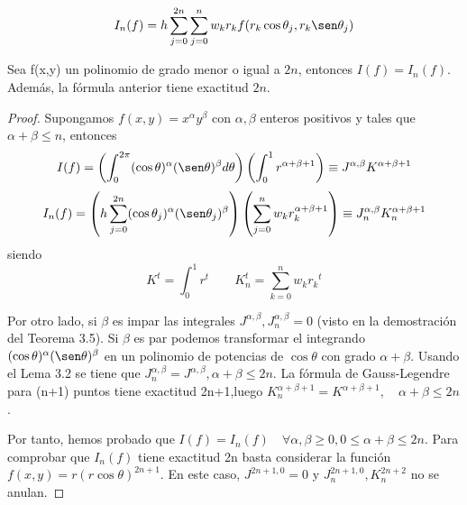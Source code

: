 $$ I_n(f) = h\sum_{j=0}^{2n}\sum_{j=0}^{n} w_k r_k f(r_k \cos\theta_j,r_k\sen\theta_j)$$
\begin{thm}Sea f(x,y) un polinomio de grado menor o igual a $2n$, entonces $I(f)=I_n(f)$. Además, la fórmula anterior tiene exactitud $2n$. 
\end{thm}
\begin{proof}
	Supongamos $f(x,y)=x^\alpha y^\beta$ con  $\alpha,\beta$ enteros positivos y tales que  $\alpha+\beta \le n$, entonces
	$$
	I(f)=\left(\int_{0}^{2\pi}(\cos\theta)^{\alpha}(\sen\theta)^{\beta}d\theta\right)\left(\int_{0}^{1}r^{\alpha+\beta +1}\right) \equiv J^{\alpha,\beta}K^{ \alpha+\beta+1 }
	$$
	$$
	I_n(f) = \left(h\sum_{j=0}^{2n}(\cos\theta_j)^{\alpha}(\sen\theta_j)^{\beta}\right) \left(\sum_{j=0}^{n}w_kr_k^{\alpha+\beta+1}\right)\equiv J_n^{\alpha,\beta}K_n^{ \alpha+\beta+1 }
	$$
	siendo
	$$
	K^t = \int_{0}^{1 } r^t \qquad K_n^t=\sum_{k=0}^{n} w_k{r_k}^t
	$$
	
	Por otro lado, si $\beta$ es impar las integrales $J^{\alpha,\beta},J_n^{\alpha,\beta}=0$ (visto en la demostración del Teorema 3.5). Si $\beta$ es par podemos transformar el integrando $(\cos \theta)^\alpha(\sen\theta)^\beta$ en un polinomio de potencias de $\cos \theta$ con grado $\alpha+\beta$. Usando el Lema 3.2 se tiene que $J_n^{\alpha,\beta} = J^{\alpha,\beta}, \alpha+\beta\le 2n$. 
	\medskip
	La fórmula de Gauss-Legendre para (n+1) puntos tiene exactitud 2n+1,luego $K_n^{ \alpha+\beta+1 }=K^{ \alpha+\beta+1 }, \quad \alpha+\beta \le 2n$.
	\medskip
	
	Por tanto, hemos probado que $I(f) = I_n(f) \quad \forall \alpha,\beta\ge 0, 0\le\alpha+\beta \le 2n $.
	Para comprobar que $I_n(f)$ tiene exactitud 2n basta considerar la función $f(x,y) = r(r\cos\theta)^{2n+1}$. En este caso, $J^{2n+1,0}=0$ y $J_n^{2n+1,0},K_n^{2n+2}$ no se anulan.
\end{proof}